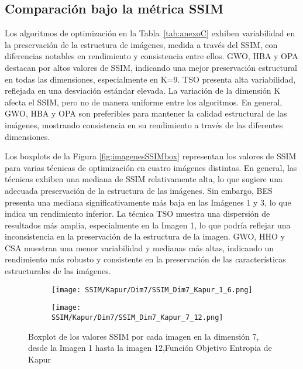 \documentclass[conference]{IEEEtran}
\begin{document}
\subsection{Comparación bajo la métrica SSIM}

\noindent Los algoritmos de optimización en la Tabla~\ref{tab:anexoC} exhiben variabilidad en la preservación de la estructura de imágenes, medida a través del SSIM, con diferencias notables en rendimiento y consistencia entre ellos. GWO, HBA y OPA destacan por altos valores de SSIM, indicando una mejor preservación estructural en todas las dimensiones, especialmente en K=9. TSO presenta alta variabilidad, reflejada en una desviación estándar elevada. La variación de la dimensión K afecta el SSIM, pero no de manera uniforme entre los algoritmos. En general, GWO, HBA y OPA son preferibles para mantener la calidad estructural de las imágenes, mostrando consistencia en su rendimiento a través de las diferentes dimensiones.

\noindent Los boxplots de la Figura \ref{fig:imagenesSSIMbox} representan los valores de SSIM para varias técnicas de optimización en cuatro imágenes distintas. En general, las técnicas exhiben una mediana de SSIM relativamente alta, lo que sugiere una adecuada preservación de la estructura de las imágenes. Sin embargo, BES presenta una mediana significativamente más baja en las Imágenes 1 y 3, lo que indica un rendimiento inferior. La técnica TSO muestra una dispersión de resultados más amplia, especialmente en la Imagen 1, lo que podría reflejar una inconsistencia en la preservación de la estructura de la imagen. GWO, HHO y CSA muestran una menor variabilidad y medianas más altas, indicando un rendimiento más robusto y consistente en la preservación de las características estructurales de las imágenes.

\begin{figure}
	\centering
	
	\begin{subfigure}{0.5\textwidth}
		\texttt{[image: SSIM/Kapur/Dim7/SSIM\_Dim7\_Kapur\_1\_6.png]}
	\end{subfigure}
	
	\begin{subfigure}{0.5\textwidth}
		\texttt{[image: SSIM/Kapur/Dim7/SSIM\_Dim7\_Kapur\_7\_12.png]}
	\end{subfigure}
	\caption{Boxplot de los valores SSIM por cada imagen en la dimensión 7, desde la Imagen 1 hasta la imagen 12,Función Objetivo Entropia de Kapur}
	\label{fig:imagenes}    
\end{figure}
\end{document}
